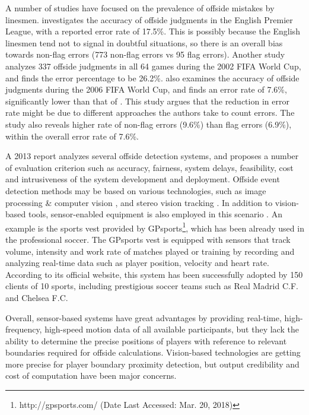 A number of studies have focused on the prevalence of offside mistakes by linesmen. 
\cite{catteeuw2010offside} investigates the accuracy of offside judgments in the English Premier League, with a reported error rate of 17.5\%. This is possibly because the English linesmen tend not to signal in doubtful situations, so there is an overall bias towards non-flag errors (773 non-flag errors vs 95 flag errors).
Another study \cite{helsen2006errors} analyzes 337 offside judgments in all 64 games during the 2002 FIFA World Cup, and finds the error percentage to be 26.2\%.
\cite{catteeuw2010offside} also examines the accuracy of offside judgments during the 2006 FIFA World Cup, and finds an error rate of 7.6\%, significantly lower than that of \cite{helsen2006errors}.
This study argues that the reduction in error rate might be due to different approaches the authors take to count errors.
The study also reveals higher rate of non-flag errors (9.6\%) than flag errors (6.9\%), within the overall error rate of 7.6\%.

A 2013 report \cite{fowler2010feasible} analyzes several offside detection systems, and proposes a number of evaluation criterion such as accuracy, fairness, system delays, feasibility, cost and intrusiveness of the system development and deployment.
Offside event detection methods may be based on various technologies, such as image processing \& computer vision \cite{naidoo2006soccer}, and stereo vision tracking  \cite{borg2007detecting}.
In addition to vision-based tools, sensor-enabled equipment is also employed in this scenario \cite{regan2013sports} \cite{garcia2011wireless}.
An example is the sports vest provided by GPsports\footnote{http://gpsports.com/ (Date Last Accessed: Mar. 20, 2018)}, which has been already used in the professional soccer.
The GPsports vest is equipped with sensors that track volume, intensity and work rate of matches played or training by recording and analyzing real-time data such as player position, velocity and heart rate.
According to its official website, this system has been successfully adopted by 150 clients of 10 sports, including prestigious soccer teams such as Real Madrid C.F. and Chelsea F.C.

Overall, sensor-based systems have great advantages by providing real-time, high-frequency, high-speed motion data of all available participants, but they lack the ability to determine the precise positions of players with reference to relevant boundaries required for offside calculations. 
Vision-based technologies are getting more precise for player boundary proximity detection, but output credibility and cost of computation have been major concerns.

